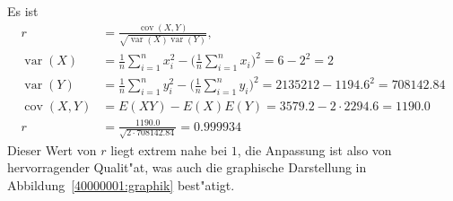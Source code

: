 \begin{loesung}
\begin{teilaufgaben}
Es ist
\begin{align*}
r
&=
\frac{\operatorname{cov}(X,Y)}{\sqrt{\operatorname{var}(X)\operatorname{var}(Y)}},
\\
\operatorname{var}(X)
&=
\frac1n\sum_{i=1}^nx_i^2-\biggl(\frac1n\sum_{i=1}^nx_i\biggr)^2
=
6-2^2=2
\\
\operatorname{var}(Y)
&=
\frac1n\sum_{i=1}^ny_i^2-\biggl(\frac1n\sum_{i=1}^ny_i\biggr)^2
=
2135212-1194.6^2=708142.84
\\
\operatorname{cov}(X,Y)
&=
E(XY)-E(X)E(Y)=3579.2-2\cdot 2294.6=1190.0
\\
r&=\frac{1190.0}{\sqrt{2\cdot 708142.84}}=0.999934
\end{align*}
Dieser Wert von $r$ liegt extrem nahe bei $1$, die Anpassung ist also von
hervorragender Qualit"at, was auch die graphische Darstellung
in Abbildung~\ref{40000001:graphik} best"atigt.
\qedhere
\end{teilaufgaben}
\end{loesung}
